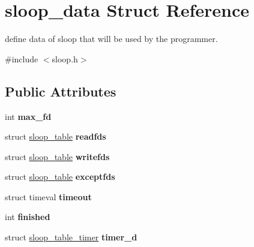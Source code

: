 \hypertarget{structsloop__data}{\section{sloop\-\_\-data \-Struct \-Reference}
\label{structsloop__data}
}


define data of sloop that will be used by the programmer.  




{\ttfamily \#include $<$sloop.\-h$>$}

\subsection*{\-Public \-Attributes}
\begin{DoxyCompactItemize}
\item 
\hypertarget{structsloop__data_aa0a38d27091d8d1109c52c7f5ad0ccfa}{int {\bfseries max\-\_\-fd}}\label{structsloop__data_aa0a38d27091d8d1109c52c7f5ad0ccfa}

\item 
\hypertarget{structsloop__data_a74583f325639b116772cfeff0fed4873}{struct \hyperlink{structsloop__table}{sloop\-\_\-table} {\bfseries readfds}}\label{structsloop__data_a74583f325639b116772cfeff0fed4873}

\item 
\hypertarget{structsloop__data_a37ccdf0ebe2cdd7ac2e502ad05c0284a}{struct \hyperlink{structsloop__table}{sloop\-\_\-table} {\bfseries writefds}}\label{structsloop__data_a37ccdf0ebe2cdd7ac2e502ad05c0284a}

\item 
\hypertarget{structsloop__data_a0a06cd23f30a9ddf0b95456b789e40c4}{struct \hyperlink{structsloop__table}{sloop\-\_\-table} {\bfseries exceptfds}}\label{structsloop__data_a0a06cd23f30a9ddf0b95456b789e40c4}

\item 
\hypertarget{structsloop__data_a1786b3d5a0c4029a422cfe66f729ae93}{struct timeval {\bfseries timeout}}\label{structsloop__data_a1786b3d5a0c4029a422cfe66f729ae93}

\item 
\hypertarget{structsloop__data_a7ccf2d410eae9d2c5d126ef761fe66d5}{int {\bfseries finished}}\label{structsloop__data_a7ccf2d410eae9d2c5d126ef761fe66d5}

\item 
\hypertarget{structsloop__data_abc2343a161c89d34659a460d424ece5d}{struct \hyperlink{structsloop__table__timer}{sloop\-\_\-table\-\_\-timer} {\bfseries timer\-\_\-d}}\label{structsloop__data_abc2343a161c89d34659a460d424ece5d}

\end{DoxyCompactItemize}


